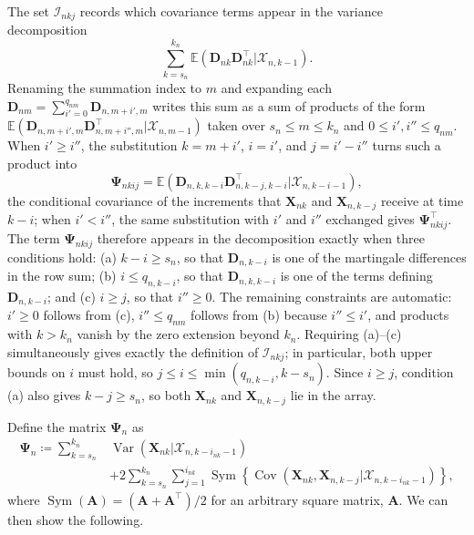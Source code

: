 \documentclass[11pt]{article}
\renewcommand\vec[1]{\boldsymbol{#1}}
\newcommand\mat[1]{\mathbf{#1}}
\DeclareMathOperator{\Cov}{Cov}
\DeclareMathOperator{\Var}{Var}
\DeclareMathOperator{\Sym}{Sym}
\newcommand{\E}{\mathbb{E}}
\newcommand{\X}{\mathcal{X}}
\newcommand{\I}{\mathcal{I}}
\theoremstyle{definition}
\begin{document}
The set $\I_{nkj}$ records which covariance terms appear in the variance decomposition
\[
\sum_{k=s_n}^{k_n} \E(\vec{D}_{nk} \vec{D}_{nk}^\top | \X_{n,k-1}).
\]
Renaming the summation index to $m$ and expanding each $\vec{D}_{nm} = \sum_{i'=0}^{q_{nm}} \vec{D}_{n,m+i',m}$ writes this sum as a sum of products of the form $\E(\vec{D}_{n,m+i',m} \vec{D}_{n,m+i'',m}^\top | \X_{n,m-1})$ taken over $s_n \leq m \leq k_n$ and $0 \leq i', i'' \leq q_{nm}$.
When $i' \geq i''$, the substitution $k = m + i'$, $i = i'$, and $j = i' - i''$ turns such a product into
\[
  \mat{\Psi}_{nkij} = \E(\vec{D}_{n,k,k-i} \vec{D}_{n,k-j,k-i}^\top | \X_{n,k-i-1}),
\]
the conditional covariance of the increments that $\vec{X}_{nk}$ and $\vec{X}_{n,k-j}$ receive at time $k-i$; when $i' < i''$, the same substitution with $i'$ and $i''$ exchanged gives $\mat{\Psi}_{nkij}^\top$.
The term $\mat{\Psi}_{nkij}$ therefore appears in the decomposition exactly when three conditions hold:
(a) $k - i \geq s_n$, so that $\vec{D}_{n,k-i}$ is one of the martingale differences in the row sum;
(b) $i \leq q_{n,k-i}$, so that $\vec{D}_{n,k,k-i}$ is one of the terms defining $\vec{D}_{n,k-i}$; and
(c) $i \geq j$, so that $i'' \geq 0$.
The remaining constraints are automatic: $i' \geq 0$ follows from (c), $i'' \leq q_{nm}$ follows from (b) because $i'' \leq i'$, and products with $k > k_n$ vanish by the zero extension beyond $k_n$.
Requiring (a)--(c) simultaneously gives exactly the definition of $\I_{nkj}$; in particular, both upper bounds on $i$ must hold, so $j \leq i \leq \min(q_{n,k-i}, k - s_n)$.
Since $i \geq j$, condition (a) also gives $k - j \geq s_n$, so both $\vec{X}_{nk}$ and $\vec{X}_{n,k-j}$ lie in the array.

Define the matrix $\mat{\Psi}_n$ as
\begin{equation}\label{eq:psi-n}
\begin{aligned}
\mat{\Psi}_n \coloneqq
\sum_{k=s_n}^{k_n}
&\Var(\vec{X}_{nk} | \X_{n,k-i_{nk}-1})\\
&+
2 \sum_{k=s_n}^{k_n}
\sum_{j=1}^{i_{nk}}
\Sym\left\{
\Cov(\vec{X}_{nk}, \vec{X}_{n,k-j} | \X_{n,k-i_{nk}-1})
\right\},
\end{aligned}
\end{equation}
where $\Sym(\mat{A}) = (\mat{A} + \mat{A}^{\top})/2$ for an arbitrary square matrix, $\mat{A}$.
We can then show the following.
\end{document}
